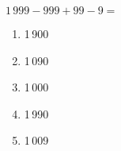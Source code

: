 $1\,999-999+99-9=$
\begin{multicols}{5}
  \begin{enumerate}[A/]
  \item 1\,900
  \item 1\,090
  \item 1\,000
  \item 1\,990
  \item 1\,009
  \end{enumerate}
\end{multicols}